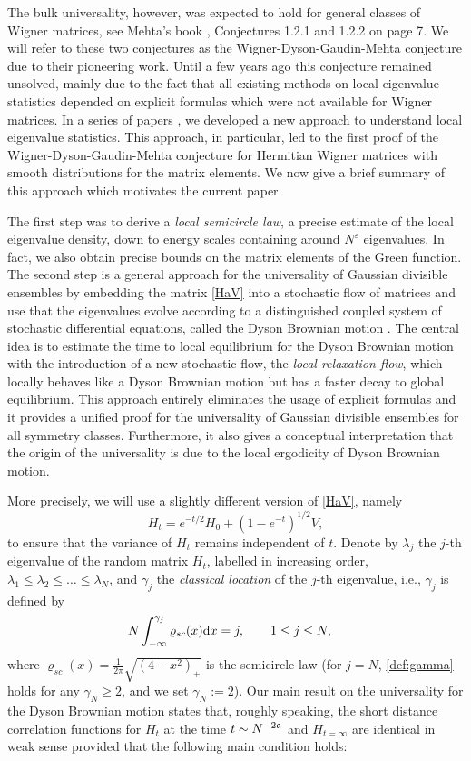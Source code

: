 \documentclass[draft]{article}
\newcommand{\fa}{{\frak a}}
\newcommand{\e}{\varepsilon}
\newcommand{\rd}{{\rm d}}
\newcommand{\be}{\begin{equation}}
\newcommand{\ee}{\end{equation}}
\newcommand{\la}{\lambda}
\numberwithin{equation}{section}
\numberwithin{theorem}{section}
\numberwithin{definition}{section}
\numberwithin{remark}{section}
\begin{document}
The bulk universality, however, was expected to hold  for general classes of  Wigner matrices, see  
Mehta's book \cite{M}, {Conjectures 1.2.1 and 1.2.2 on page 7.
 We will refer to these two conjectures as the Wigner-Dyson-Gaudin-Mehta conjecture due to their pioneering work.} 
Until a few years ago this conjecture
remained unsolved,  mainly due to the fact that  all { existing methods on local eigenvalue statistics 
depended} on explicit formulas which were not available for Wigner matrices.  
In a series of papers \cite{ESY1, ESY2, ESY3,  EPRSY, ESY4,  ESYY, EYY, EYY2}, we  developed a new approach 
to understand local eigenvalue statistics.  
This approach,  in particular,  led to the first proof  \cite{ EPRSY} of the  Wigner-Dyson-Gaudin-Mehta conjecture 
for Hermitian Wigner matrices with { smooth distributions for the matrix elements.} 
We now give a brief summary of this approach which motivates the current paper. 

The first step  was to derive a 
{\it local semicircle law}, a precise estimate of the local eigenvalue 
density,   down to energy scales containing   around $ N^\e$ eigenvalues. 
In fact, we also obtain precise bounds on the matrix elements of
the Green function.
The second step is a general approach for the universality of Gaussian divisible ensembles
by embedding the matrix \eqref{HaV} into a stochastic flow of matrices
and use that the eigenvalues evolve according to a distinguished coupled
system of stochastic differential equations, called the Dyson Brownian motion \cite{Dy}.
 The central idea is to estimate the time to local equilibrium  for 
the Dyson Brownian motion 
with the introduction of a new stochastic flow, 
the {\it local relaxation flow}, which locally behaves like a Dyson Brownian motion
but has a faster decay to global equilibrium.  
This approach \cite{ESY4, ESYY}
entirely eliminates  the usage of explicit formulas and  it  provides 
 a  unified proof for the  universality 
of Gaussian divisible ensembles for all symmetry classes.
Furthermore,  it also gives  a conceptual interpretation that the origin of the  universality 
is due to the local ergodicity of  Dyson Brownian motion.  


More precisely, we will use a slightly different version  of \eqref{HaV}, namely
\be
  H_t = e^{-t/2}H_0+(1-e^{-t})^{1/2} V,
\label{HaVOU}
\ee
to ensure that the variance of $H_t$ remains independent of $t$.
Denote by $\lambda_j$ the $j$-th eigenvalue of the random matrix $H_t$, labelled in
increasing order, $\la_1\le \la_2 \le \ldots \le \la_N$,
and $\gamma_j$ 
the {\it classical location} of the $j$-th eigenvalue, i.e., $\gamma_j$ is defined by 
\be
 N \int_{-\infty}^{\gamma_j} \varrho_{sc}(x) \rd x = j, \qquad 1\leq j\le N,  \quad
\label{def:gamma}
\ee
where $\varrho_{sc}(x)=\frac{1}{2\pi}\sqrt{(4-x^2)_+}$
 is the semicircle law (for $j=N$, \eqref{def:gamma} holds for any $\gamma_N\ge 2$, and we set $\gamma_N:=2$). Our main result on the universality for the Dyson Brownian motion
states that, roughly speaking,  the short distance correlation functions for $H_t$ 
at the  time $t \sim N^{-2\fa}$ and $H_{t = \infty}$ are identical in weak sense provided
 that  the following main condition holds: 
\end{document}

